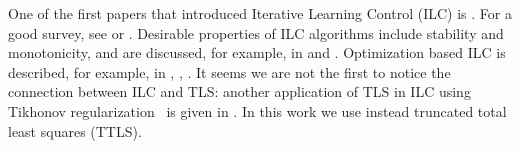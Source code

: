 One of the first papers that introduced Iterative Learning Control (ILC) is \cite{Arimoto84}. For a good survey, see \cite{Bristow06} or \cite{Moore07}. Desirable properties of ILC algorithms include stability and monotonicity, and are discussed, for example, in \cite{Norrloef02} and \cite{Bristow06}. Optimization based ILC is described, for example, in \cite{Amann95}, \cite{Bristow06}, \cite{Moore07}. It seems we are not the first to notice the connection between ILC and TLS: another application of TLS in ILC using Tikhonov regularization~\cite{Golub99} is given in \cite{ZhangBo14}. In this work we use instead truncated total least squares (TTLS).

